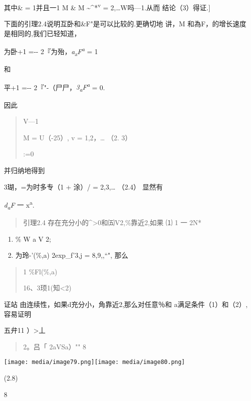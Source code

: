 \documentclass{article}
\begin{document}
其中\& = 1并且一1 M \& M \textasciitilde{}\^{}*\textsuperscript{v} =
2,\ldots{}W吗---1.从而 结论（3）得证.{]}

下面的引理2.4说明互卧和\&F"是可以比较的.更确切地 讲，M
和為F，的增长速度是相同的,我们已轻知道，

为卧+1 =-\/- 2『为殆，\emph{a\textsubscript{x}F\textsuperscript{a}} = 1

和

平+1 =-\/- 2『"-（尸尸，\emph{3\textsubscript{a}F\textsuperscript{a}} =
0.

因此

\begin{quote}
V---1

M = U（-25）, v = 1,2，\ldots{} （2. 3）

:=0
\end{quote}

并归纳地得到

3瑚，=为时多专（1 + 涂）/ = 2,3,\ldots{} （2.4） 显然有

\emph{d\textsubscript{a}F} 一 x\textsuperscript{a}.

\begin{quote}
引理2.4 存在充分小的\^{}\textgreater{}0和㈤V2,\%靠近2,如果 ⑴ 1 一 2N*
\end{quote}

\begin{enumerate}
\def\labelenumi{(\arabic{enumi})}
\setcounter{enumi}{1}
\item
  \% W a V 2;
\item
  \textbar{}为玲-'(\%,a) \textbar{} 2exp\_f'3,j = 8,9,,``", 那么
\end{enumerate}

\begin{quote}
1 {\textbar{}\%Fl(\%,a)\textbar{}}

16、\textbar{}3顼1(知\textless{}2)\textbar{}
\end{quote}

证站 由连续性，如果d充分小，角靠近2,那么对任意％和
a满足条件（1）和（2）,容易证明

五弁11 ）\textgreater{}丄

\begin{quote}
2。吕「 \textbar{}2aVSa）"" 8
\end{quote}

\texttt{[image: media/image79.png]}\texttt{[image: media/image80.png]}

(2.8)

8
\end{document}
